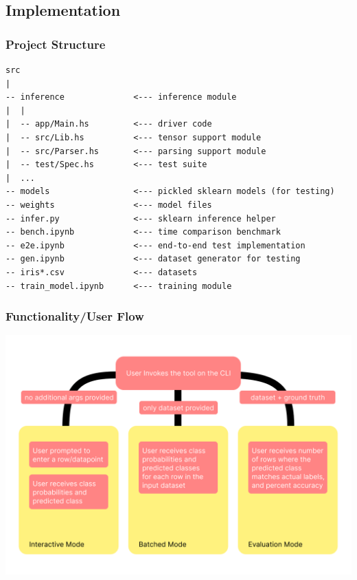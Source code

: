 \documentclass[12pt, titlepage]{article}
\begin{document}
\subsection{Implementation}
\subsubsection{Project Structure}
\begin{verbatim}
src
|
-- inference              <--- inference module
|  |
|  -- app/Main.hs         <--- driver code
|  -- src/Lib.hs          <--- tensor support module
|  -- src/Parser.hs       <--- parsing support module
|  -- test/Spec.hs        <--- test suite
|  ...
-- models                 <--- pickled sklearn models (for testing)
-- weights                <--- model files
-- infer.py               <--- sklearn inference helper
-- bench.ipynb            <--- time comparison benchmark
-- e2e.ipynb              <--- end-to-end test implementation
-- gen.ipynb              <--- dataset generator for testing
-- iris*.csv              <--- datasets
-- train_model.ipynb      <--- training module
\end{verbatim}

\subsubsection{Functionality/User Flow}
\begin{center}
	\includegraphics[width = \textwidth]{../images/UserFlow.png}
\end{center}
\end{document}
